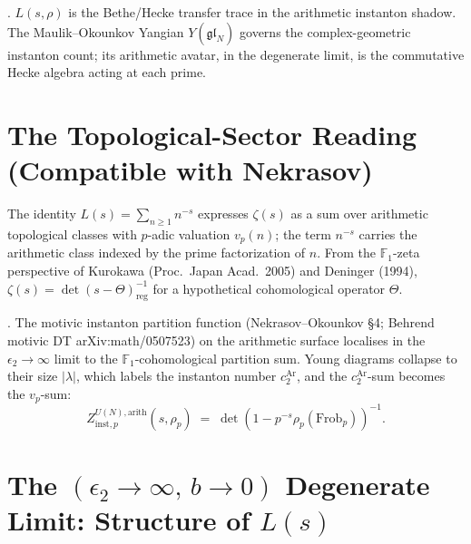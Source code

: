 \begin{theorem}
\label{v4-arith:thm:L-as-MO-trace}
\ClaimStatusHeuristic. \(L(s,\rho)\) is the Bethe/Hecke transfer
trace in the arithmetic instanton shadow. The Maulik--Okounkov
Yangian \(Y(\widehat{\mathfrak{gl}}_{N})\) governs the complex-geometric
instanton count; its arithmetic avatar, in the degenerate limit, is
the commutative Hecke algebra acting at each prime.
\end{theorem}

\section{The Topological-Sector Reading (Compatible with Nekrasov)}
\label{v4-arith:nk:topological-sector}

\begin{remark}
The identity \(L(s)=\sum_{n\geq 1}n^{-s}\) expresses \(\zeta(s)\) as a sum over
arithmetic topological classes with \(p\)-adic valuation \(v_{p}(n)\); the
term \(n^{-s}\) carries the arithmetic class indexed by the prime
factorization of \(n\). From the \(\mathbb{F}_{1}\)-zeta perspective of
Kurokawa (Proc.~Japan Acad.~2005) and Deninger (1994),
\(\zeta(s)=\det(s-\Theta)_{\mathrm{reg}}^{-1}\)
for a hypothetical cohomological operator \(\Theta\).
\end{remark}

\begin{theorem}
\label{v4-arith:thm:motivic-topological-compatibility}
\ClaimStatusConjectured. The motivic instanton partition function
(Nekrasov--Okounkov \S4; Behrend motivic DT arXiv:math/0507523) on
the arithmetic surface localises in the \(\epsilon_{2}\to\infty\)
limit to the \(\mathbb{F}_{1}\)-cohomological partition sum. Young
diagrams collapse to their size \(|\lambda|\), which labels the
instanton number \(c_{2}^{\mathrm{Ar}}\), and the \(c_{2}^{\mathrm{Ar}}\)-sum
becomes the \(v_{p}\)-sum:
\begin{equation*}
Z^{U(N),\mathrm{arith}}_{\mathrm{inst},p}(s,\rho_{p})
\;=\;\det(1-p^{-s}\rho_{p}(\mathrm{Frob}_{p}))^{-1}.
\end{equation*}
\end{theorem}

\section{The \((\epsilon_{2}\to\infty,\,b\to 0)\) Degenerate Limit: Structure of \(L(s)\)}
\label{v4-arith:nk:summary}

